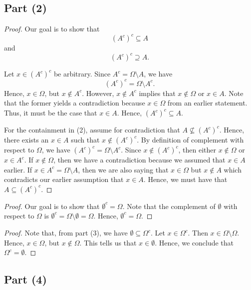 \documentclass[a4paper]{article}
\begin{document}
\subsection*{Part (2)}

\begin{proof}
    Our goal is to show that 
    \[ (A^{c})^{c} \subseteq A \tag{1}  \] and 
    \[ (A^{c})^{c} \supseteq A \tag{2}. \]

    Let \( x \in (A^{c})^{c} \) be arbitrary. Since \( A^{c} = \Omega \setminus  A  \), we have  
    \[  (A^{c})^{c} =  \Omega \setminus  A^{c}. \]
    Hence, \( x \in \Omega \), but \( x \notin A^{c} \). However, \( x \notin A^{c} \) implies that \( x \notin \Omega \) or \( x \in A  \). Note that the former yields a contradiction because \( x \in \Omega  \) from an earlier statement. Thus, it must be the case that \( x \in A \). Hence, \( (A^{c})^{c} \subseteq  A   \).

    For the containment in (2), assume for contradiction that \( A \not\subseteq (A^{c})^{c} \). Hence, there exists an \( x \in A  \) such that \( x \notin (A^{c})^{c} \). By definition of complement with respect to \( \Omega \), we have \( (A^{c})^{c} = \Omega \setminus  A^{c} \). Since \( x \notin (A^{c})^{c} \), then either \( x \notin \Omega \) or \( x \in A^{c}  \). If \( x \notin \Omega \), then we have a contradiction because we assumed that \( x \in A  \) earlier. If \( x \in A^{c} = \Omega \setminus  A  \), then we are also saying that \( x \in \Omega \) but \( x \notin A  \) which contradicts our earlier assumption that \( x \in A  \). Hence, we must have that \( A \subseteq  (A^{c})^{c} \).
\end{proof}

\begin{proof}
Our goal is to show that \( \emptyset^{c} = \Omega \). Note that the complement of \( \emptyset  \) with respect to \( \Omega \) is \( \emptyset^{c} = \Omega \setminus  \emptyset = \Omega \). Hence, \( \emptyset^{c} = \Omega \).
\end{proof}

\begin{proof}
    Note that, from part (3), we have \( \emptyset \subseteq \Omega^{c} \). Let \( x \in \Omega^{c} \). Then \( x \in \Omega \setminus \Omega \). Hence, \( x \in \Omega \), but \( x \notin \Omega  \). This tells us that \( x \in \emptyset \). Hence, we conclude that \( \Omega^{c} = \emptyset \).
\end{proof}

\subsection*{Part (4)}
\end{document}
